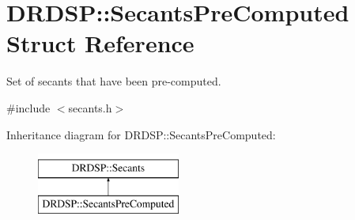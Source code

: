 \hypertarget{struct_d_r_d_s_p_1_1_secants_pre_computed}{\section{D\-R\-D\-S\-P\-:\-:Secants\-Pre\-Computed Struct Reference}
\label{struct_d_r_d_s_p_1_1_secants_pre_computed}
}


Set of secants that have been pre-\/computed.  




{\ttfamily \#include $<$secants.\-h$>$}

Inheritance diagram for D\-R\-D\-S\-P\-:\-:Secants\-Pre\-Computed\-:\begin{figure}[H]
\begin{center}
\leavevmode
\includegraphics[height=2.000000cm]{struct_d_r_d_s_p_1_1_secants_pre_computed}
\end{center}
\end{figure}

